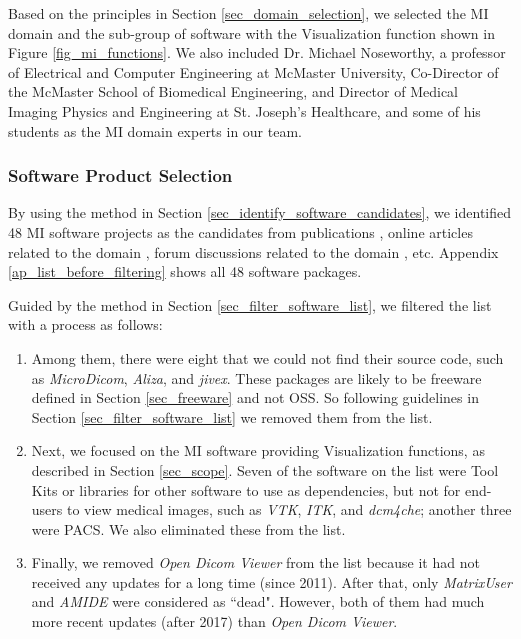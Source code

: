 \documentclass[3p, 12pt,authoryear]{elsarticle}
\begin{document}
Based on the principles in Section \ref{sec_domain_selection}, we selected the
MI domain and the sub-group of software with the Visualization function shown in
Figure \ref{fig_mi_functions}. We also included Dr. Michael Noseworthy, a
professor of Electrical and Computer Engineering at McMaster University,
Co-Director of the McMaster School of Biomedical Engineering, and Director of
Medical Imaging Physics and Engineering at St. Joseph’s Healthcare, and some of
his students as the MI domain experts in our team.

\subsubsection{Software Product Selection} \label{sec_mi_software_selection}

By using the method in Section \ref{sec_identify_software_candidates}, we
identified 48 MI software projects as the candidates from publications
\citep{Bjorn2017} \citep{Bruhschwein2019} \citep{Haak2015}, online articles related
to the domain \citep{Emms2019} \citep{Hasan2020} \citep{Mu2019}, forum discussions
related to the domain \citep{Samala2014}, etc. Appendix
\ref{ap_list_before_filtering} shows all 48 software packages.

Guided by the method in Section \ref{sec_filter_software_list}, we filtered the
list with a process as follows:

\begin{enumerate}

\item Among them, there were eight that we could not find their source code,
such as \textit{MicroDicom}, \textit{Aliza}, and \textit{jivex}. These packages
are likely to be freeware defined in Section \ref{sec_freeware} and not OSS. So
following guidelines in Section \ref{sec_filter_software_list} we removed them
from the list.

\item Next, we focused on the MI software providing Visualization functions, as
described in Section \ref{sec_scope}. Seven of the software on the list were
Tool Kits or libraries for other software to use as dependencies, but not for
end-users to view medical images, such as \textit{VTK}, \textit{ITK}, and
\textit{dcm4che}; another three were PACS. We also eliminated these from the
list.

\item Finally, we removed \textit{Open Dicom Viewer} from the list because it
had not received any updates for a long time (since 2011). After that, only
\textit{MatrixUser} and \textit{AMIDE} were considered as ``dead". However, both
of them had much more recent updates (after 2017) than \textit{Open Dicom
Viewer}.

\end{enumerate}
\end{document}
